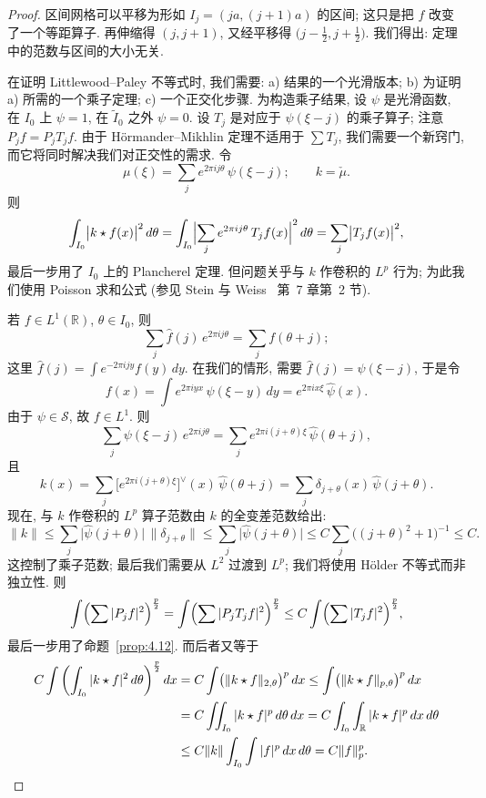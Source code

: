 \begin{proof}
区间网格可以平移为形如 $I_{j}=(ja,(j+1)a)$ 的区间; 这只是把 $f$ 改变了一个等距算子. 再伸缩得 $(j,j+1)$, 又经平移得 $\bigl(j-\frac{1}{2},j+\frac{1}{2}\bigr)$. 我们得出: 定理中的范数与区间的大小无关.

在证明 Littlewood--Paley 不等式时, 我们需要: a) 结果的一个光滑版本; b) 为证明 a) 所需的一个乘子定理; c) 一个正交化步骤. 为构造乘子结果, 设 $\psi$ 是光滑函数, 在 $I_0$ 上 $\psi=1$, 在 $\tilde{I}_0$ 之外 $\psi=0$. 设 $T_j$ 是对应于 $\psi(\xi-j)$ 的乘子算子; 注意 $P_jf=P_jT_jf$. 由于 H\"ormander--Mikhlin 定理不适用于 $\sum T_j$, 我们需要一个新窍门, 而它将同时解决我们对正交性的需求. 令
\[
\mu(\xi)=\sum_j e^{2\pi ij\theta}\,\psi(\xi-j);\qquad k=\check{\mu}.
\]
则
\[
\int_{I_{0}}\bigl|k\star f(x)\bigr|^{2}\,d\theta
=\int_{I_{0}}\Bigl|\sum_j e^{2\pi ij\theta}\,T_{j}f(x)\Bigr|^{2}\,d\theta
=\sum_j\bigl|T_{j}f(x)\bigr|^{2},
\]
最后一步用了 $I_0$ 上的 Plancherel 定理. 但问题关乎与 $k$ 作卷积的 $L^{p}$ 行为; 为此我们使用 Poisson 求和公式 (参见 Stein 与 Weiss~\cite{steinweiss} 第~7 章第~2 节).

若 $f\in L^1(\mathbb{R})$, $\theta\in I_0$, 则
\[
\sum_j\hat{f}(j)\,e^{2\pi ij\theta}=\sum_j f(\theta+j);
\]
这里 $\hat{f}(j)=\int e^{-2\pi ijy}f(y)\,dy$. 在我们的情形, 需要 $\hat{f}(j)=\psi(\xi-j)$, 于是令
\[
f(x)=\int e^{2\pi iyx}\,\psi(\xi-y)\,dy=e^{2\pi ix\xi}\,\hat{\psi}(x).
\]
由于 $\psi\in\mathcal{S}$, 故 $f\in L^1$. 则
\[
\sum_j\psi(\xi-j)\,e^{2\pi ij\theta}=\sum_j e^{2\pi i(j+\theta)\xi}\,\hat{\psi}(\theta+j),
\]
且
\[
k(x)=\sum_j\bigl[e^{2\pi i(j+\theta)\xi}\bigr]^{\vee}(x)\,\hat{\psi}(\theta+j)
=\sum_j\delta_{j+\theta}(x)\,\hat{\psi}(j+\theta).
\]
现在, 与 $k$ 作卷积的 $L^{p}$ 算子范数由 $k$ 的全变差范数给出:
\[
\|k\|\leq\sum_j\bigl|\hat{\psi}(j+\theta)\bigr|\,\|\delta_{j+\theta}\|
\leq\sum_j\bigl|\hat{\psi}(j+\theta)\bigr|
\leq C\sum_j\bigl((j+\theta)^{2}+1\bigr)^{-1}\leq C.
\]
这控制了乘子范数; 最后我们需要从 $L^{2}$ 过渡到 $L^{p}$; 我们将使用 H\"older 不等式而非独立性. 则
\[
\int\Bigl(\sum|P_{j}f|^{2}\Bigr)^{\frac{p}{2}}
=\int\Bigl(\sum|P_{j}T_{j}f|^{2}\Bigr)^{\frac{p}{2}}
\leq C\int\Bigl(\sum|T_{j}f|^{2}\Bigr)^{\frac{p}{2}},
\]
最后一步用了命题~\ref{prop:4.12}. 而后者又等于
\begin{align*}
C\int\left(\int_{I_{0}}|k\star f|^{2}\,d\theta\right)^{\frac{p}{2}}dx
&=C\int\bigl(\|k\star f\|_{2,\theta}\bigr)^{p}\,dx
\leq\int\bigl(\|k\star f\|_{p,\theta}\bigr)^{p}\,dx \\
&=C\iint_{I_{0}}|k\star f|^{p}\,d\theta\,dx
=C\int_{I_{0}}\int_{\mathbb{R}}|k\star f|^{p}\,dx\,d\theta \\
&\leq C\|k\|\int_{I_{0}}\int|f|^{p}\,dx\,d\theta=C\|f\|_{p}^{p}. \qedhere
\end{align*}
\end{proof}

